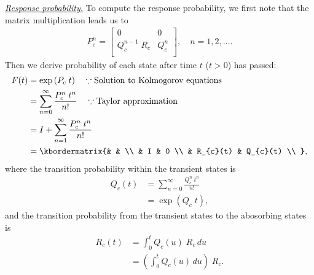 \documentclass[doc]{apa6}
\newcommand{\subsubsubsection}[1]{\textit{\underline{#1}}}
\begin{document}
\subsubsubsection{Response probability.} To compute the response probability, we first note that the
matrix multiplication leads us to
\begin{align}
    P_{c}^{n} = \left[
        \begin{array}{cc}
            0                    & 0 \\
            Q_{c}^{n-1} \; R_{c} & Q_{c}^{n}\\
        \end{array}
    \right], \quad n = 1, 2, \dots.
\end{align}
Then we derive probability of each state after time $t$ ($t > 0$) has passed:
\begin{align}
    F(t) &= \exp{(P_{c} \; t)} \quad \because \mbox{Solution to Kolmogorov equations}\\
         &= \sum_{n=0}^{\infty} \frac{P_{c}^{n} \; t^{n}}{n!} \quad \because \mbox{Taylor approximation}\\
         &= I + \sum_{n=1}^{\infty} \frac{P_{c}^{n} \; t^{n}}{n!} \\
         &= \kbordermatrix{%
            &          & \\
            & I        & 0 \\
            & R_{c}(t) & Q_{c}(t) \\
        },
\end{align}
where the transition probability within the transient states is
\begin{align}
    Q_{c}(t) &= \sum_{n=0}^{\infty} \frac{Q_{c}^{n} \; t^{n}}{n!}\\
             &= \exp{(Q_{c} \; t)},
\end{align}
and the transition probability from the transient states to the abosorbing states is
\begin{align}
    R_{c}(t) &= \int_{0}^{t} Q_c{(u)} \; R_{c} \, du \\
             &= \left( \int_{0}^{t} Q_c{(u)} \, du \right) \; R_{c}.
\end{align}
\end{document}

